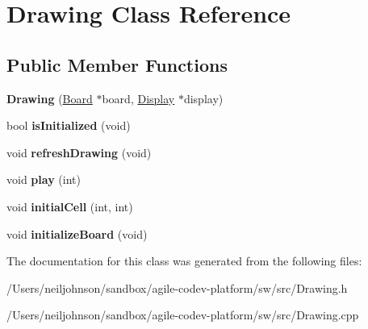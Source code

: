 \hypertarget{class_drawing}{\section{Drawing Class Reference}
\label{class_drawing}
}
\subsection*{Public Member Functions}
\begin{DoxyCompactItemize}
\item 
\hypertarget{class_drawing_a0c72054134258f0cc9faa0a28f29d8e6}{{\bfseries Drawing} (\hyperlink{class_board}{Board} $\ast$board, \hyperlink{class_display}{Display} $\ast$display)}\label{class_drawing_a0c72054134258f0cc9faa0a28f29d8e6}

\item 
\hypertarget{class_drawing_a3f871774278189f8fc0b0ee17dee9bb3}{bool {\bfseries is\+Initialized} (void)}\label{class_drawing_a3f871774278189f8fc0b0ee17dee9bb3}

\item 
\hypertarget{class_drawing_a6362cd3a4d223f6ce719bbe8a78e4678}{void {\bfseries refresh\+Drawing} (void)}\label{class_drawing_a6362cd3a4d223f6ce719bbe8a78e4678}

\item 
\hypertarget{class_drawing_a262442a8c5088a9d1a48e5fd3a727ac4}{void {\bfseries play} (int)}\label{class_drawing_a262442a8c5088a9d1a48e5fd3a727ac4}

\item 
\hypertarget{class_drawing_aedc140a5811f608a0ae0cc46e65a687e}{void {\bfseries initial\+Cell} (int, int)}\label{class_drawing_aedc140a5811f608a0ae0cc46e65a687e}

\item 
\hypertarget{class_drawing_a86076acc6d1bda3d3a0fc271c96fff62}{void {\bfseries initialize\+Board} (void)}\label{class_drawing_a86076acc6d1bda3d3a0fc271c96fff62}

\end{DoxyCompactItemize}


The documentation for this class was generated from the following files\+:\begin{DoxyCompactItemize}
\item 
/\+Users/neiljohnson/sandbox/agile-\/codev-\/platform/sw/src/Drawing.\+h\item 
/\+Users/neiljohnson/sandbox/agile-\/codev-\/platform/sw/src/Drawing.\+cpp\end{DoxyCompactItemize}
